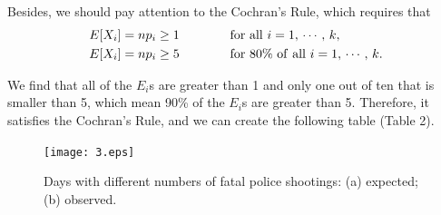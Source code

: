 \documentclass[a4paper]{article}
\begin{document}
	Besides, we should pay attention to the Cochran's Rule, which requires that
\begin{equation}
\begin{split}
&E[X_i]=np_i\ge1\qquad \qquad {\rm for\ all}\ i=1,\,\cdots,\,k,\\
&E[X_i]=np_i\ge5\qquad \qquad {\rm for\ 80\% \ of\ all}\ i=1,\,\cdots,\,k.
\nonumber
\end{split}
\end{equation}

	We find that all of the $E_i$s are greater than 1 and only one out of ten that is smaller than 5, which mean 90\% of the $E_i$s are greater than 5. Therefore, it satisfies the Cochran's Rule, and we can create the following table (Table 2).

\begin{table}[H]
\centering
\begin{spacing}{1.10}
\end{spacing}
\caption{Expected and observed days with different numbers of fatal police shootings.}
\end{table}

\begin{figure}[H]
\centering
\texttt{[image: 3.eps]}
\captionsetup{justification=centering}
\caption{Days with different numbers of fatal police shootings: (a) expected; (b) observed.}
\end{figure}
\end{document}
